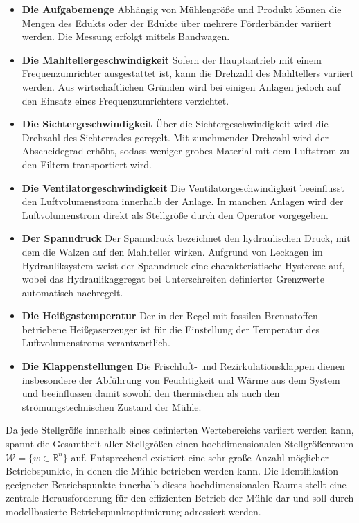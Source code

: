 \begin{itemize}
    \item \textbf{Die Aufgabemenge} \newline
    Abhängig von Mühlengröße und Produkt können die Mengen des Edukts oder der Edukte über mehrere Förderbänder variiert werden. Die Messung erfolgt mittels Bandwagen.
    \item \textbf{Die Mahltellergeschwindigkeit} \newline
    Sofern der Hauptantrieb mit einem Frequenzumrichter ausgestattet ist, kann die Drehzahl des Mahltellers variiert werden. Aus wirtschaftlichen Gründen wird bei einigen Anlagen jedoch auf den Einsatz eines Frequenzumrichters verzichtet.
    \item \textbf{Die Sichtergeschwindigkeit} \newline
    Über die Sichtergeschwindigkeit wird die Drehzahl des Sichterrades geregelt. Mit zunehmender Drehzahl wird der Abscheidegrad erhöht, sodass weniger grobes Material mit dem Luftstrom zu den Filtern transportiert wird.
    \item \textbf{Die Ventilatorgeschwindigkeit} \newline
    Die Ventilatorgeschwindigkeit beeinflusst den Luftvolumenstrom innerhalb der Anlage. In manchen Anlagen wird der Luftvolumenstrom direkt als Stellgröße durch den Operator vorgegeben.
    \item \textbf{Der Spanndruck} \newline
    Der Spanndruck bezeichnet den hydraulischen Druck, mit dem die Walzen auf den Mahlteller wirken. 
    Aufgrund von Leckagen im Hydrauliksystem weist der Spanndruck eine charakteristische Hysterese auf, wobei das Hydraulikaggregat bei Unterschreiten definierter Grenzwerte automatisch nachregelt.
    \item \textbf{Die Heißgastemperatur} \newline
    Der in der Regel mit fossilen Brennstoffen betriebene Heißgaserzeuger ist für die Einstellung der Temperatur des Luftvolumenstroms verantwortlich.
    \item \textbf{Die Klappenstellungen} \newline
    Die Frischluft- und Rezirkulationsklappen dienen insbesondere der Abführung von Feuchtigkeit und Wärme aus dem System und beeinflussen damit sowohl den thermischen als auch den strömungstechnischen Zustand der Mühle.
\end{itemize}
%
Da jede Stellgröße innerhalb eines definierten Wertebereichs variiert werden kann, spannt die Gesamtheit aller Stellgrößen einen hochdimensionalen Stellgrößenraum $\mathcal{W}=\{w \in \mathbb{R}^n\}$ auf. Entsprechend existiert eine sehr große Anzahl möglicher Betriebspunkte, in denen die Mühle betrieben werden kann. Die Identifikation geeigneter Betriebspunkte innerhalb dieses hochdimensionalen Raums stellt eine zentrale Herausforderung für den effizienten Betrieb der Mühle dar und soll durch modellbasierte Betriebspunktoptimierung adressiert werden.
%
